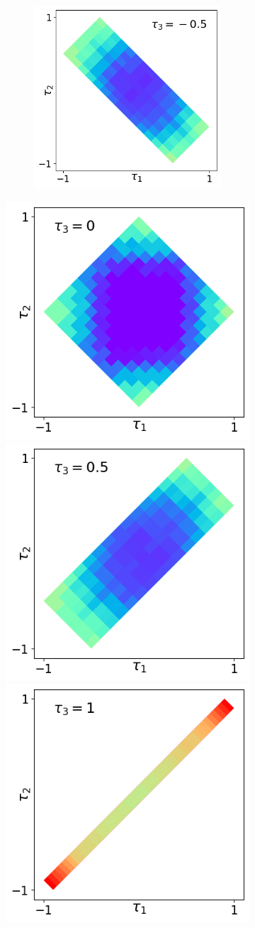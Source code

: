 \documentclass[12pt]{standalone}
\begin{document}
\begin{figure}
\begin{subfigure}{0.9\textwidth}
\begin{subfigure}{.333\textwidth}
\includegraphics[width=.95\columnwidth]{corte2-2.png} \\
\end{subfigure}
\includegraphics[width=.322\columnwidth]{corte3-2.png}
\includegraphics[width=.322\columnwidth]{corte4-2.png}
\includegraphics[width=.322\columnwidth]{corte5-2.png}

\end{subfigure}
\end{figure}
\end{document}

